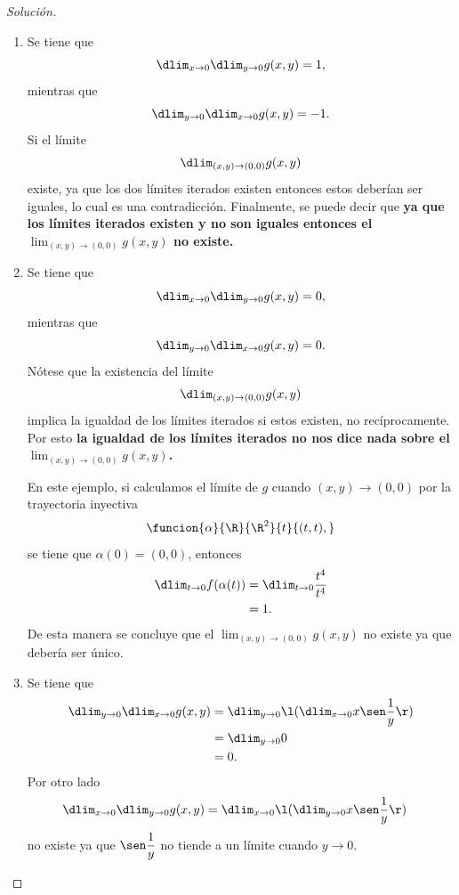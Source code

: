 \documentclass[a4,11pt]{aleph-notas}
\begin{document}
\begin{proof}[Solución]
\begin{enumerate}
        \item 
            Se tiene que
            \[
                \dlim_{x\to 0}\dlim_{y\to 0}g(x,y)=1,
            \]
            mientras que
            \[
                \dlim_{y\to 0}\dlim_{x\to 0}g(x,y)=-1.
            \]
            Si el límite
            \[
                \dlim_{(x,y)\to (0,0)}g(x,y)
            \]
            existe, ya que los dos límites iterados existen entonces estos deberían ser iguales, lo cual es una contradicción. Finalmente, se puede decir  que \textbf{ya que los límites iterados existen y no son iguales entonces el \boldmath$\lim_{(x,y)\to (0,0)}g(x,y)$ no existe.} 
            
        \item
            Se tiene que
            \[
                \dlim_{x\to 0}\dlim_{y\to 0}g(x,y)=0,
            \]
            mientras que
            \[
                \dlim_{y\to 0}\dlim_{x\to 0}g(x,y)=0.
            \]
            Nótese que la existencia del límite 
            \[
                \dlim_{(x,y)\to (0,0)}g(x,y)
            \]
            implica la igualdad de los límites iterados si estos existen, no recíprocamente. Por esto \textbf{la igualdad de los límites iterados no nos dice nada sobre el \boldmath$\lim_{(x,y)\to (0,0)}g(x,y)$.} 
            
            En este ejemplo, si calculamos el límite de $g$ cuando $(x,y)\to (0,0)$ por la trayectoria inyectiva
            \[
                \funcion{\alpha}{\R}{\R^2}{t}{(t,t),}
            \]
            se tiene que $\alpha(0)=(0,0)$, entonces
            \begin{align*}
                \dlim_{t\to 0}f(\alpha(t))&=\dlim_{t\to 0}\dfrac{t^4}{t^4}\\
                &=1.
            \end{align*}
            De esta manera se concluye que el $\lim_{(x,y)\to (0,0)}g(x,y)$ no existe ya que debería ser único.
            
        \item   
            Se tiene que 
            \begin{align*}
                \dlim_{y\to 0}\dlim_{x\to 0}g(x,y)&=\dlim_{y\to 0}\l(\dlim_{x\to 0} x\sen \dfrac{1}{y} \r)\\
                &=\dlim_{y\to 0}0\\
                &=0.
            \end{align*}
            Por otro lado
            \begin{align*}
                \dlim_{x\to 0}\dlim_{y\to 0}g(x,y)&=\dlim_{x\to 0}\l(\dlim_{y\to 0} x\sen \dfrac{1}{y} \r)
            \end{align*}
            no existe ya que $\sen \dfrac{1}{y}$ no tiende a un límite cuando $y\to 0$.
            

\end{enumerate}
\end{proof}
\end{document}
